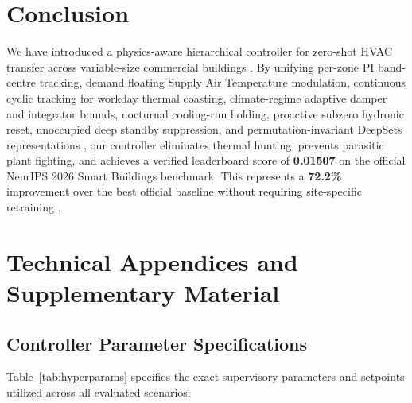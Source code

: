 \documentclass{article}
\begin{document}
\section{Conclusion}
We have introduced a physics-aware hierarchical controller for zero-shot HVAC transfer across variable-size commercial buildings \cite{goldfeder2026smart,goldfeder2024smart}. By unifying per-zone PI band-centre tracking, demand floating Supply Air Temperature modulation, continuous cyclic tracking for workday thermal coasting, climate-regime adaptive damper and integrator bounds, nocturnal cooling-run holding, proactive subzero hydronic reset, unoccupied deep standby suppression, and permutation-invariant DeepSets representations \cite{zaheer2017deep}, our controller eliminates thermal hunting, prevents parasitic plant fighting, and achieves a verified leaderboard score of \textbf{0.01507} on the official NeurIPS 2026 Smart Buildings benchmark. This represents a \textbf{72.2\%} improvement over the best official baseline without requiring site-specific retraining \cite{wang2020reinforcement,zhang2019whole}.

\newpage



\newpage
\appendix
\section{Technical Appendices and Supplementary Material}

\subsection{Controller Parameter Specifications}
Table~\ref{tab:hyperparams} specifies the exact supervisory parameters and setpoints utilized across all evaluated scenarios:
\end{document}
